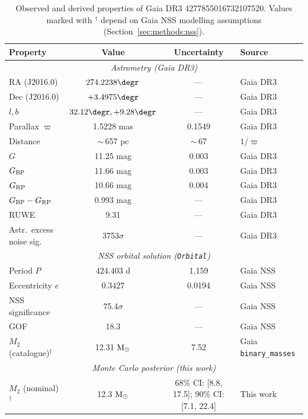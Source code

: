 \documentclass[usenatbib,fleqn]{mnras}
\newcommand{\Msun}{{\rm M}_\odot}
\begin{document}
\begin{table}
\centering
\caption{Observed and derived properties of
Gaia DR3 4277855016732107520.
Values marked with $^\dagger$ depend on Gaia NSS modelling
assumptions (Section~\ref{sec:methods:nss}).}
\label{tab:observed}
\begin{tabular}{lccl}
\toprule
Property & Value & Uncertainty & Source \\
\midrule
\multicolumn{4}{c}{\textit{Astrometry (Gaia DR3)}} \\
RA (J2016.0)           & $274.2238\degr$     & ---      & Gaia DR3 \\
Dec (J2016.0)          & $+3.4975\degr$      & ---      & Gaia DR3 \\
$l, b$                 & $32.12\degr, +9.28\degr$ & --- & Gaia DR3 \\
Parallax $\varpi$      & 1.5228 mas          & 0.1549   & Gaia DR3 \\
Distance               & $\sim$\,657 pc      & $\sim$\,67 & $1/\varpi$ \\
$G$                    & 11.25 mag           & 0.003    & Gaia DR3 \\
$G_{\rm BP}$           & 11.66 mag           & 0.003    & Gaia DR3 \\
$G_{\rm RP}$           & 10.66 mag           & 0.004    & Gaia DR3 \\
$G_{\rm BP} - G_{\rm RP}$ & 0.993 mag        & ---      & Gaia DR3 \\
RUWE                   & 9.31                & ---      & Gaia DR3 \\
Astr.\ excess noise sig.\ & 3753$\sigma$     & ---      & Gaia DR3 \\
\midrule
\multicolumn{4}{c}{\textit{NSS orbital solution (\texttt{Orbital})}} \\
Period $P$               & 424.403 d           & 1.159    & Gaia NSS \\
Eccentricity $e$         & 0.3427              & 0.0194   & Gaia NSS \\
NSS significance         & 75.4$\sigma$        & ---      & Gaia NSS \\
GOF                      & 18.3                & ---      & Gaia NSS \\
$M_2$ (catalogue)$^\dagger$ & 12.31 $\Msun$   & 7.52     & Gaia \texttt{binary\_masses} \\
\midrule
\multicolumn{4}{c}{\textit{Monte Carlo posterior (this work)}} \\
$M_2$ (nominal)$^\dagger$ & 12.3 $\Msun$  & 68\% CI: [8.8, 17.5]; 90\% CI: [7.1, 22.4]  & This work \\

\end{tabular}
\end{table}
\end{document}
